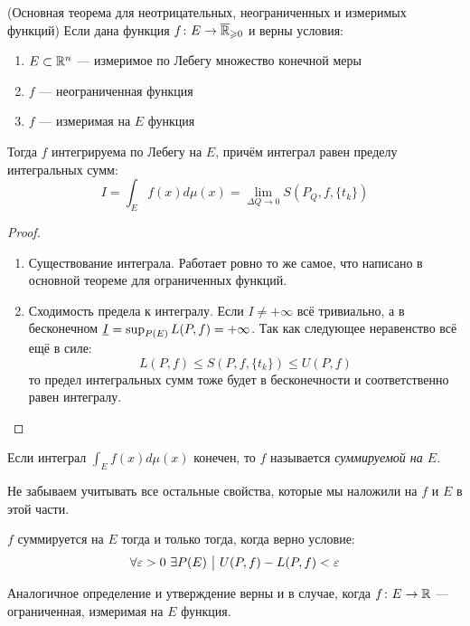 \begin{theorem} (Основная теорема для неотрицательных, неограниченных и измеримых функций)
	Если дана функция $f \colon E \to \overline{\mathbb{R}}_{\geqslant 0}$ и верны условия:
	\begin{enumerate}
		\item $E \subset \mathbb{R}^n$ --- измеримое по Лебегу множество конечной меры
		
		\item $f$ --- неограниченная функция
		
		\item $f$ --- измеримая на $E$ функция
	\end{enumerate}
	Тогда $f$ интегрируема по Лебегу на $E$, причём интеграл равен пределу интегральных сумм:
	\[
		I = \int_E f(x)d\mu(x) = \lim_{\Delta Q \to 0} S(P_Q, f, \{t_k\})
	\]
\end{theorem}

\begin{proof}~
	\begin{enumerate}
		\item Существование интеграла. Работает ровно то же самое, что написано в основной теореме для ограниченных функций.
		
		\item Сходимость предела к интегралу. Если $I \neq +\infty$ всё тривиально, а в бесконечном $\underline{I} = \sup_{P(E)} L(P, f) = +\infty$. Так как следующее неравенство всё ещё в силе:
		\[
			L(P, f) \le S(P, f, \{t_k\}) \le U(P, f)
		\]
		то предел интегральных сумм тоже будет в бесконечности и соответственно равен интегралу.
	\end{enumerate}
\end{proof}

\begin{definition}
	Если интеграл $\int_E f(x)d\mu(x)$ конечен, то $f$ называется \textit{суммируемой на $E$}.
\end{definition}

\begin{anote}
	Не забываем учитывать все остальные свойства, которые мы наложили на $f$ и $E$ в этой части.
\end{anote}

\begin{proposition}
	$f$ суммируется на $E$ тогда и только тогда, когда верно условие:
	\[
		\forall \varepsilon > 0\ \exists P(E) \ \big|\  U(P, f) - L(P, f) < \varepsilon
	\]
\end{proposition}

\begin{note}
	Аналогичное определение и утверждение верны и в случае, когда $f \colon E \to \mathbb{R}$ --- ограниченная, измеримая на $E$ функция.
\end{note}

